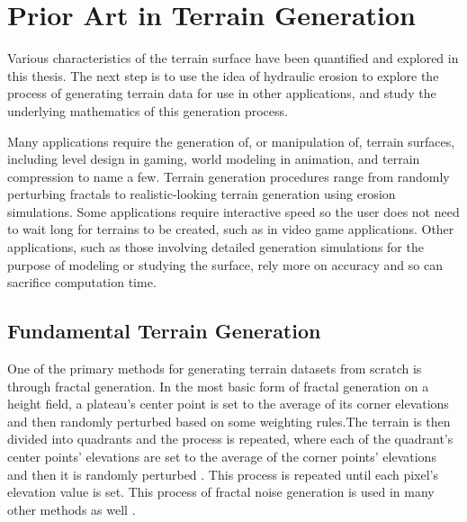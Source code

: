 \chapter{Prior Art in Terrain Generation}

Various characteristics of the terrain surface have been quantified and explored in this thesis.
The next step is to use the idea of hydraulic erosion to explore the process of generating terrain data for use in other applications, and study the underlying mathematics of this generation process.


Many applications require the generation of, or manipulation of, terrain surfaces, including level design in gaming, world modeling in animation, and terrain compression to name a few. Terrain generation procedures range from randomly perturbing fractals to realistic-looking terrain generation using erosion simulations. Some applications require interactive speed so the user does not need to wait long for terrains to be created, such as in video game applications. Other applications, such as those involving detailed generation simulations for the purpose of modeling or studying the surface, rely more on accuracy and so can sacrifice computation time. 

\section{Fundamental Terrain Generation}

One of the primary methods for generating terrain datasets from scratch is through fractal generation. In the most basic form of fractal generation on a height field, a plateau's center point is set to the average of its corner elevations and then randomly perturbed based on some weighting rules.The terrain is then divided into quadrants and the process is repeated, where each of the quadrant's center points' elevations are set to the average of the corner points' elevations and then it is randomly perturbed \cite{Perlin:1985:IS:325165.325247}. This process is repeated until each pixel's elevation value is set. This process of fractal noise generation is used in many other methods as well \cite{Smelik09asurvey}. 

